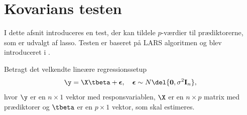 \section{Kovarians testen} \label{subsec:kovarians_test}
I dette afsnit introduceres en test, der kan tildele \(p\)-værdier til prædiktorerne, som er udvalgt af lasso.
Testen er baseret på LARS algoritmen og blev introduceret i \citep{lockhart}.

Betragt det velkendte lineære regressionssetup
\begin{align}
\y = \X \tbeta + \boldsymbol{\epsilon}, \quad \boldsymbol{\epsilon} \sim N\del{\mathbf{0}, \sigma^2 \mathbf{I}_n}, \label{eq:set-up}
\end{align}
hvor \(\y\) er en \(n \times 1\) vektor med responsvariablen, \(\X\) er en \(n \times p\) matrix med prædiktorer og \(\tbeta\) er en \(p \times 1\) vektor, som skal estimeres.

